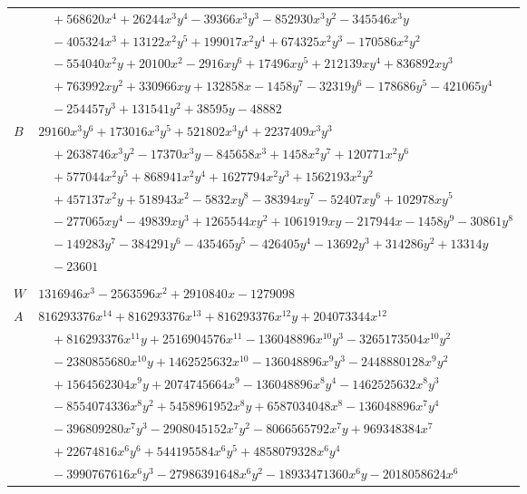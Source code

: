 \documentclass[11pt]{article}
\begin{document}
\begin{longtable}{@{}ll@{}}
 & $\quad +568620x^{4}+26244x^{3}y^{4}-39366x^{3}y^{3}-852930x^{3}y^{2}-345546x^{3}y$\\
 & $\quad -405324x^{3}+13122x^{2}y^{5}+199017x^{2}y^{4}+674325x^{2}y^{3}-170586x^{2}y^{2}$\\
 & $\quad -554040x^{2}y+20100x^{2}-2916xy^{6}+17496xy^{5}+212139xy^{4}+836892xy^{3}$\\
 & $\quad +763992xy^{2}+330966xy+132858x-1458y^{7}-32319y^{6}-178686y^{5}-421065y^{4}$\\
 & $\quad -254457y^{3}+131541y^{2}+38595y-48882$\\
$B$ & $29160x^{3}y^{6}+173016x^{3}y^{5}+521802x^{3}y^{4}+2237409x^{3}y^{3}$\\
 & $\quad +2638746x^{3}y^{2}-17370x^{3}y-845658x^{3}+1458x^{2}y^{7}+120771x^{2}y^{6}$\\
 & $\quad +577044x^{2}y^{5}+868941x^{2}y^{4}+1627794x^{2}y^{3}+1562193x^{2}y^{2}$\\
 & $\quad +457137x^{2}y+518943x^{2}-5832xy^{8}-38394xy^{7}-52407xy^{6}+102978xy^{5}$\\
 & $\quad -277065xy^{4}-49839xy^{3}+1265544xy^{2}+1061919xy-217944x-1458y^{9}-30861y^{8}$\\
 & $\quad -149283y^{7}-384291y^{6}-435465y^{5}-426405y^{4}-13692y^{3}+314286y^{2}+13314y$\\
 & $\quad -23601$\\
\addlinespace[3pt]
\multicolumn{2}{@{}l}{$i=5$, $m=17496$, neighbours $29,30,44,52,60,62,68,82,90$}\\
$W$ & $1316946x^{3}-2563596x^{2}+2910840x-1279098$\\
$A$ & $816293376x^{14}+816293376x^{13}+816293376x^{12}y+204073344x^{12}$\\
 & $\quad +816293376x^{11}y+2516904576x^{11}-136048896x^{10}y^{3}-3265173504x^{10}y^{2}$\\
 & $\quad -2380855680x^{10}y+1462525632x^{10}-136048896x^{9}y^{3}-2448880128x^{9}y^{2}$\\
 & $\quad +1564562304x^{9}y+2074745664x^{9}-136048896x^{8}y^{4}-1462525632x^{8}y^{3}$\\
 & $\quad -8554074336x^{8}y^{2}+5458961952x^{8}y+6587034048x^{8}-136048896x^{7}y^{4}$\\
 & $\quad -396809280x^{7}y^{3}-2908045152x^{7}y^{2}-8066565792x^{7}y+969348384x^{7}$\\
 & $\quad +22674816x^{6}y^{6}+544195584x^{6}y^{5}+4858079328x^{6}y^{4}$\\
 & $\quad -3990767616x^{6}y^{3}-27986391648x^{6}y^{2}-18933471360x^{6}y-2018058624x^{6}$\\

\end{longtable}
\end{document}
